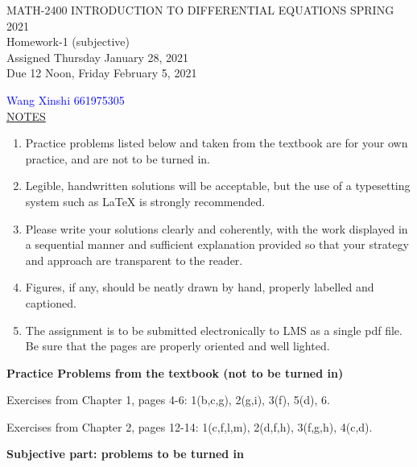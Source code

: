 \documentclass{article}
\newcommand{\bc}{\begin{center}}
\newcommand{\ec}{\end{center}}
\newcommand{\ul}{\underline}
\newcommand{\n}{\noindent}
\newcommand{\benum}{\begin{enumerate}}
\newcommand{\eenum}{\end{enumerate}}
\newcommand{\blue}{\color{blue}}
\newcommand{\nc}{\normalcolor}
\begin{document}
\begin{center}
\large{ MATH-2400 \hspace{.25in}  INTRODUCTION TO DIFFERENTIAL EQUATIONS \hspace{.25in}SPRING 2021\\ Homework-1 (subjective) \\ Assigned Thursday January 28, 2021 \\ Due 12 Noon, Friday February 5, 2021}\end{center}
\textcolor{blue}{Wang Xinshi 661975305}\\
\bigskip
\n\ul{NOTES}
\benum
\item 
Practice problems listed below and taken from the textbook are for your own practice, and are not to be turned in.
\item 
Legible, handwritten solutions will be acceptable, but the use of a typesetting system such as LaTeX is strongly recommended.  \blue{\bf Do not turn in your rough attempt at solving a problem; once you have worked out the solution, copy it neatly or typeset it before submission, after removing all false starts.}\nc
\item 
Please write your solutions clearly and coherently, with the work displayed in a sequential manner and sufficient explanation provided so that your strategy and approach are transparent to the reader. 
\item 
Figures, if any, should be neatly drawn by hand, properly labelled and captioned.  
\item 
The assignment is to be submitted electronically to LMS  as a single pdf file.  Be sure that the pages are properly oriented and well lighted.  \blue{\bf Please do not e-mail your homework submission to the TAs or the instructors.}\nc
\eenum

\bigskip


\bc {\bf Practice Problems from the textbook (not to be turned in)} \ec

\n Exercises from Chapter 1, pages 4-6: 1(b,c,g), 2(g,i), 3(f), 5(d), 6.

\n Exercises from Chapter 2, pages 12-14: 1(c,f,l,m), 2(d,f,h), 3(f,g,h), 4(c,d).


\bc {\bf Subjective part: problems to be turned in} \ec
\end{document}
